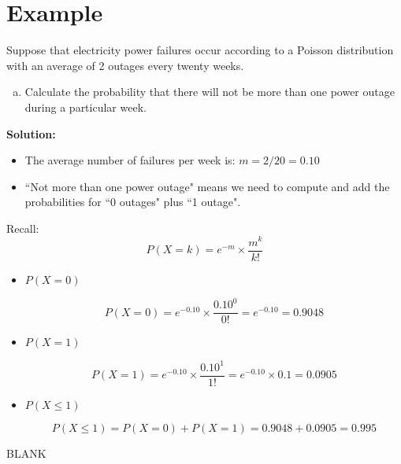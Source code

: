 \documentclass[a4paper,12pt]{article}
\begin{document}
	\large 
	
	
	\section*{Example}
	Suppose that electricity power failures occur according to a Poisson distribution
	with an average of 2 outages every twenty weeks. 
	\begin{enumerate}[(a)]
		\item  Calculate the probability that there will
		not be more than one power outage during a particular week.
	\end{enumerate}
	
	\noindent \textbf{Solution:}
	
	\begin{itemize}
		\item  The average number of failures per week is: $m = 2/20 = 0.10$
		
		\item  ``Not more than one  power outage" means we need to compute and add the probabilities for ``0 outages" plus ``1 outage".
	\end{itemize}
	
	
	
	Recall: \[P(X = k) = e^{-m}\times \frac{m^k}{k!}\]
	
	
	\begin{itemize}
		
		\item  $P(X = 0)$
		
		\[P(X = 0) = e^{-0.10} \times \frac{0.10^0}{0!} = e^{-0.10} = 0.9048\]
		
		
		\item  $P(X = 1)$
		
		\[P(X = 1) = e^{-0.10}\times \frac{0.10^1}{1!} = e^{-0.10}\times 0.1 = 0.0905\]
		
		\item  $P(X \leq 1)$
		
		\[P(X \leq 1) = P(X = 0) + P(X = 1) = 0.9048 + 0.0905 = 0.995\]
		
	\end{itemize}
	\newpage
	BLANK
\end{document}
